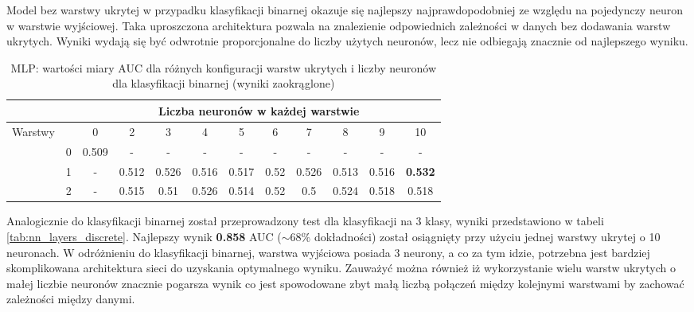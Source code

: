 \documentclass[a4paper, twoside, 11pt, openright]{article}
\begin{document}
Model bez warstwy ukrytej w przypadku klasyfikacji binarnej okazuje się najlepszy najprawdopodobniej ze względu na pojedynczy neuron w warstwie wyjściowej. Taka uproszczona architektura pozwala na znalezienie odpowiednich zależności w danych bez dodawania warstw ukrytych. Wyniki wydają się być odwrotnie proporcjonalne do liczby użytych neuronów, lecz nie odbiegają znacznie od najlepszego wyniku.

\begin{table}[H]
    \centering
    \begin{tabular}{|c|c|c|c|c|c|c|c|c|c|c|c|}
        \hline
         & &  \multicolumn{10}{c|}{Liczba neuronów w każdej warstwie}  \\ \hline
        \multirow{4}{*}{Warstwy} & & 0 & 2 & 3 & 4 & 5 & 6 & 7 & 8 & 9 & 10  \\ \cline{2 - 12}
			& 0 & 0.509 & - & - & - & - & - & - & - & - & - \\ \cline{2 - 12} 
			& 1 & - &  0.512 &  0.526 &  0.516 &  0.517 &  0.52 &  0.526 &  0.513 &  0.516  & \textbf{0.532} \\ \cline{2 - 12} 
			& 2 & - & 0.515 &    0.51 &   0.526 &   0.514 &    0.52 &     0.5 &   0.524 &   0.518 & 0.518 \\ \cline{2 - 12} \hline

    \end{tabular}
    \caption{MLP: wartości miary AUC dla różnych konfiguracji warstw ukrytych i liczby neuronów dla klasyfikacji binarnej (wyniki zaokrąglone)}
    \label{tab:nn_layers_binary}
\end{table}

Analogicznie do klasyfikacji binarnej został przeprowadzony test dla klasyfikacji na 3 klasy, wyniki przedstawiono w tabeli \ref{tab:nn_layers_discrete}. Najlepszy wynik \textbf{0.858} AUC ($\sim 68\%$ dokładności) został osiągnięty przy użyciu jednej warstwy ukrytej o 10 neuronach. W odróżnieniu do klasyfikacji binarnej, warstwa wyjściowa posiada 3 neurony, a co za tym idzie, potrzebna jest bardziej skomplikowana architektura sieci do uzyskania optymalnego wyniku. Zauważyć można również iż wykorzystanie wielu warstw ukrytych o małej liczbie neuronów znacznie pogarsza wynik co jest spowodowane zbyt małą liczbą połączeń między kolejnymi warstwami by zachować zależności między danymi.
\end{document}
